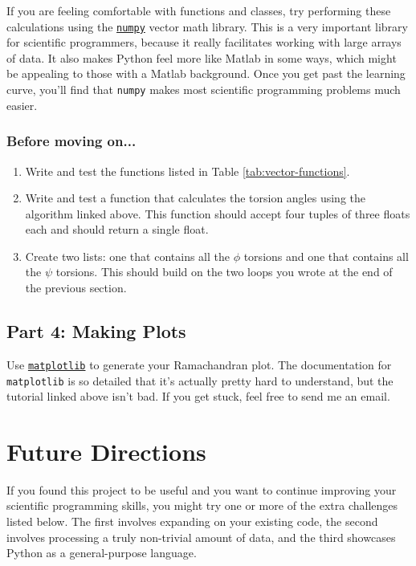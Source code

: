 \documentclass{article}
\newcommand{\bbphi}{\ensuremath{\phi}}
\newcommand{\bbpsi}{\ensuremath{\psi}}
\newcommand{\module}[2]{\href{#2}{\texttt{#1}}}
\newenvironment{problems}
{\subsubsection{Before moving on...} \begin{enumerate}}
{\end{enumerate}}
\begin{document}
If you are feeling comfortable with functions and classes, try performing these 
calculations using the 
\module{numpy}{http://wiki.scipy.org/Tentative_NumPy_Tutorial} vector math 
library.  This is a very important library for scientific programmers, because 
it really facilitates working with large arrays of data.  It also makes Python 
feel more like Matlab in some ways, which might be appealing to those with a 
Matlab background.  Once you get past the learning curve, you'll find that 
\texttt{numpy} makes most scientific programming problems much easier.

\begin{problems}
 \item Write and test the functions listed in Table \ref{tab:vector-functions}.
 \item Write and test a function that calculates the torsion angles using the 
  algorithm linked above.  This function should accept four tuples of three 
  floats each and should return a single float.
 \item Create two lists: one that contains all the \bbphi{} torsions and one 
  that contains all the \bbpsi{} torsions.  This should build on the two loops 
  you wrote at the end of the previous section.
\end{problems}

\subsection{Part 4: Making Plots}

Use \module{matplotlib}{http://matplotlib.org/users/pyplot_tutorial.html} to 
generate your Ramachandran plot.  The documentation for \texttt{matplotlib} is 
so detailed that it's actually pretty hard to understand, but the tutorial 
linked above isn't bad.  If you get stuck, feel free to send me an email.

\pagebreak

\section{Future Directions}

If you found this project to be useful and you want to continue improving your 
scientific programming skills, you might try one or more of the extra 
challenges listed below.  The first involves expanding on your existing code, 
the second involves processing a truly non-trivial amount of data, and the 
third showcases Python as a general-purpose language.
\end{document}

